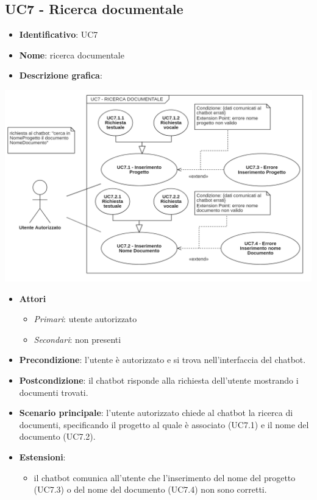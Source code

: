 \subsection{UC7 - Ricerca documentale}
\begin{itemize}
    \item \textbf{Identificativo}: UC7
    \item \textbf{Nome}: ricerca documentale
    \item \textbf{Descrizione grafica}:
\end{itemize}
\begin{center}
    \includegraphics{images/UC7.png} 
\end{center}
 \begin{itemize}
    \item \textbf{Attori}
 \begin{itemize} 
    \item \textit{Primari}: utente autorizzato
    \item \textit{Secondari}: non presenti
 \end{itemize}
 \item \textbf{Precondizione}: l'utente è autorizzato e si trova nell'interfaccia del chatbot.
 \item \textbf{Postcondizione}: il chatbot risponde alla richiesta dell'utente mostrando i documenti trovati.
 \item \textbf{Scenario principale}: l'utente autorizzato chiede al chatbot la ricerca di documenti, specificando il progetto al quale è associato (UC7.1) e il nome del documento (UC7.2).
 \item \textbf{Estensioni}: 
 \begin{itemize} 
    \item il chatbot comunica all'utente che l'inserimento del nome del progetto (UC7.3) o del nome del documento (UC7.4) non sono corretti.
 \end{itemize}
\end{itemize}
\newpage
